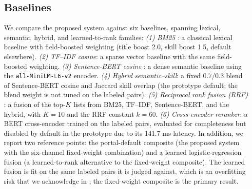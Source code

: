 \subsection{Baselines}\label{sec:4.2}
We compare the proposed system against six baselines, spanning lexical, semantic, hybrid, and learned-to-rank families:
\emph{(1) BM25} \citep{robertson1995okapi}: a classical lexical baseline with field-boosted weighting (title boost 2.0, skill boost 1.5, default elsewhere).
\emph{(2) TF--IDF cosine}: a sparse vector baseline with the same field-boosted weighting.
\emph{(3) Sentence-BERT cosine} \citep{reimers2019sentence}: a dense semantic baseline using the \texttt{all-MiniLM-L6-v2} encoder.
\emph{(4) Hybrid semantic--skill}: a fixed $0.7/0.3$ blend of Sentence-BERT cosine and Jaccard skill overlap (the prototype default; the blend weight is not tuned on the labeled pairs).
\emph{(5) Reciprocal rank fusion (RRF)} \citep{cormack2010reciprocal}: a fusion of the top-$K$ lists from BM25, TF--IDF, Sentence-BERT, and the hybrid, with $K = 10$ and the RRF constant $k = 60$.
\emph{(6) Cross-encoder reranker}: a BERT cross-encoder trained on the labeled pairs, evaluated for completeness but disabled by default in the prototype due to its 141.7 ms latency.
In addition, we report two reference points: the portal-default composite (the proposed system with the six-channel fixed-weight combination) and a learned logistic-regression fusion (a learned-to-rank alternative to the fixed-weight composite).
The learned fusion is fit on the same labeled pairs it is judged against, which is an overfitting risk that we acknowledge in ; the fixed-weight composite is the primary result.

